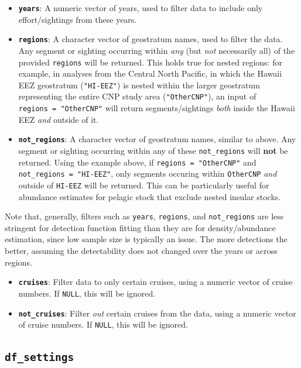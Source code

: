 \documentclass[
]{book}
\begin{document}
\begin{itemize}
\item
  \textbf{\texttt{years}}: A numeric vector of years, used to filter data to include only effort/sightings from these years.
\item
  \textbf{\texttt{regions}}: A character vector of geostratum names, used to filter the data. Any segment or sighting occurring within \emph{any} (but \emph{not} necessarily all) of the provided \texttt{regions} will be returned. This holds true for nested regions: for example, in analyses from the Central North Pacific, in which the Hawaii EEZ geostratum (\texttt{"HI-EEZ"}) is nested within the larger geostratum representing the entire CNP study area (\texttt{"OtherCNP"}), an input of \texttt{regions\ =\ "OtherCNP"} will return segments/sightings \emph{both} inside the Hawaii EEZ \emph{and} outside of it.
\item
  \textbf{\texttt{not\_regions}}: A character vector of geostratum names, similar to above. Any segment or sighting occurring within any of these \texttt{not\_regions} will \textbf{not} be returned. Using the example above, if \texttt{regions\ =\ "OtherCNP"} and \texttt{not\_regions\ =\ "HI-EEZ"}, only segments occuring within \texttt{OtherCNP} \emph{and} outside of \texttt{HI-EEZ} will be returned. This can be particularly useful for abundance estimates for pelagic stock that exclude nested insular stocks.
\end{itemize}

Note that, generally, filters such as \texttt{years}, \texttt{regions}, and \texttt{not\_regions} are less stringent for detection function fitting than they are for density/abundance estimation, since low sample size is typically an issue. The more detections the better, assuming the detectability does not changed over the years or across regions.

\begin{itemize}
\item
  \textbf{\texttt{cruises}}: Filter data to only certain cruises, using a numeric vector of cruise numbers. If \texttt{NULL}, this will be ignored.
\item
  \textbf{\texttt{not\_cruises}}: Filter \emph{out} certain cruises from the data, using a numeric vector of cruise numbers. If \texttt{NULL}, this will be ignored.
\end{itemize}

\hypertarget{df_settings}{%
\subsection*{\texorpdfstring{\texttt{df\_settings}}{df\_settings}}\label{df_settings}}
\end{document}
